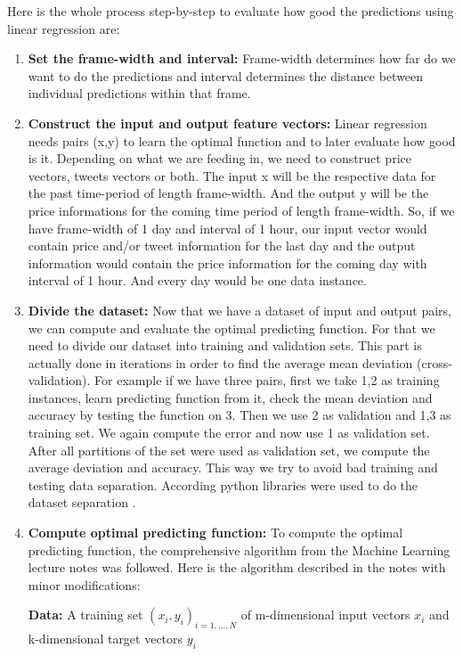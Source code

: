 \documentclass[a4paper,11pt,oneside]{article}
\begin{document}
  Here is the whole process step-by-step to evaluate how good the predictions using linear regression are:
  \begin{enumerate}
  	\item {\bf Set the frame-width and interval:} Frame-width determines how far do we want to do the predictions and interval determines the distance between individual predictions within that frame.
  	\item {\bf Construct the input and output feature vectors:} Linear regression needs pairs (x,y) to learn the optimal function and to later evaluate how good is it. Depending on what we are feeding in, we need to construct price vectors, tweets vectors or both. The input x will be the respective data for the past time-period of length frame-width. And the output y will be the price informations for the coming time period of length frame-width. So, if we have frame-width of 1 day and interval of 1 hour, our input vector would contain price and/or tweet information for the last day and the output information would contain the price information for the coming day with interval of 1 hour. And every day would be one data instance. 
  	\item {\bf Divide the dataset:} Now that we have a dataset of input and output pairs, we can compute and evaluate the optimal predicting function. For that we need to divide our dataset into training and validation sets. This part is actually done in iterations in order to find the average mean deviation (cross-validation). For example if we have three pairs, first we take 1,2 as training instances, learn predicting function from it, check the mean deviation and accuracy by testing the function on 3. Then we use 2 as validation and 1,3 as training set. We again compute the error and now use 1 as validation set. After all partitions of the set were used as validation set, we compute the average deviation and accuracy. This way we try to avoid bad training and testing data separation. According python libraries were used to do the dataset separation \cite{pythonkfold}.
  	
  	\item {\bf Compute optimal predicting function: } To compute the optimal predicting function, the comprehensive algorithm  from the Machine Learning lecture notes was followed. Here is the algorithm described in the notes \cite{mllecturenotes} with minor modifications:
  	\begin{center}
  		\parbox{300pt}{
  			{\bf Data:} A training set $(x_i, y_i)_{i=1,...,N}$ of m-dimensional input vectors $x_i$ and k-dimensional target vectors $y_i$ 
  			
}
\end{center}
\end{enumerate}
\end{document}
